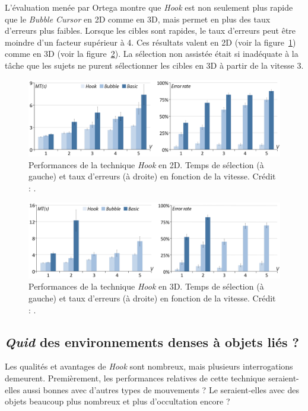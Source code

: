 	L'évaluation menée par Ortega montre que \emph{Hook} est non seulement plus rapide que le \emph{Bubble Cursor} en 2D comme en 3D, mais permet en plus des taux d'erreurs plus faibles. Lorsque les cibles sont rapides, le taux d'erreurs peut être moindre d'un facteur supérieur à 4. Ces résultats valent en 2D (voir la figure~\ref{fig:hookRes2d}) comme en 3D (voir la figure~\ref{fig:hookRes3d}). La sélection non assistée était si inadéquate à la tâche que les sujets ne purent sélectionner les cibles en 3D à partir de la vitesse 3.

	\begin{figure}[H]
		\centering
		\includegraphics[width=\textwidth]{figures/ch2/hookRes2d}
		\caption[\emph{Hook} -- performances en 2D]{Performances de la technique \emph{Hook} en 2D. Temps de sélection (à gauche) et taux d'erreurs (à droite) en fonction de la vitesse. Crédit : \cite{ortega2013hook}.}
		\label{fig:hookRes2d}
	\end{figure}
	
	\begin{figure}[H]
		\centering
		\includegraphics[width=\textwidth]{figures/ch2/hookRes3d}
		\caption[\emph{Hook} -- performances en 2D]{Performances de la technique \emph{Hook} en 3D. Temps de sélection (à gauche) et taux d'erreurs (à droite) en fonction de la vitesse. Crédit : \cite{ortega2013hook}.}
		\label{fig:hookRes3d}
	\end{figure}
	
	\subsection{\emph{Quid} des environnements denses à objets liés ?}
	Les qualités et avantages de \emph{Hook} sont nombreux, mais plusieurs interrogations demeurent. Premièrement, les performances relatives de cette technique seraient-elles aussi bonnes avec d'autres types de mouvements ? Le seraient-elles avec des objets beaucoup plus nombreux et plus d'occultation encore ?
	
